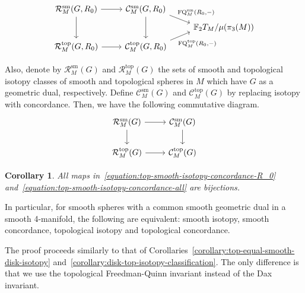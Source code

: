 \documentclass[11pt]{amsart}
\newtheorem{corollary}[theorem]{Corollary}
\theoremstyle{definition}
\theoremstyle{theorem-giventitle}
\theoremstyle{definition-giventitle}
\numberwithin{equation}{section}
\def\cC{\mathcal{C}}
\def\cR{\mathcal{R}}
\def\bF{{\mathbb{F}}}
\def\sm{\mathrm{sm}}
\def\top{\mathrm{top}}
\def\FQ{\operatorname{FQ}}
\begin{document}
\begin{equation}
  \begin{tikzcd}[row sep=tiny]
    \cR^\sm_M(G,R_0) \ar[r] \ar[dd]
    & \cC^\sm_M(G,R_0) \ar[dd]
      \ar[rd,"{\FQ^\sm_M(R_0,-)}",end anchor={[yshift=-.8ex]north west},pos=.3]
    \\
    & & \bF_2 T_M / \mu(\pi_3(M))
    \\
    \cR^\top_M(G,R_0) \ar[r]
    & \cC^\top_M(G,R_0)
      \ar[ru,"{\FQ^\top_M(R_0,-)}"',end anchor={[yshift=.8ex]south west},pos=.3]
    \\
  \end{tikzcd}
  \label{equation:top-smooth-isotopy-concordance-R_0}
\end{equation}
Also, denote by $\cR^\sm_M(G)$ and $\cR^\top_M(G)$ the sets of smooth and topological isotopy classes of smooth and topological spheres in $M$ which have $G$ as a geometric dual, respectively.
Define $\cC^\sm_M(G)$ and $\cC^\top_M(G)$ by replacing isotopy with concordance.
Then, we have the following commutative diagram.
\begin{equation}
  \begin{tikzcd}
    \cR^\sm_M(G) \ar[r] \ar[d] & \cC^\sm_M(G) \ar[d]
    \\
    \cR^\top_M(G) \ar[r] & \cC^\top_M(G)
  \end{tikzcd}
  \label{equation:top-smooth-isotopy-concordance-all}
\end{equation}

\begin{corollary}
  \label{corollary:top-equal-smooth-sphere-isotopy-concordance}
  All maps in~\eqref{equation:top-smooth-isotopy-concordance-R_0} and~\eqref{equation:top-smooth-isotopy-concordance-all} are bijections.
\end{corollary}

In particular, for smooth spheres with a common smooth geometric dual in a smooth 4-manifold, the following are equivalent: smooth isotopy, smooth concordance, topological isotopy and topological concordance.

The proof proceeds similarly to that of Corollaries~\ref{corollary:top-equal-smooth-disk-isotopy} and~\ref{corollary:disk-top-isotopy-classification}\@. The only difference is that we use the topological Freedman-Quinn invariant instead of the Dax invariant.
\end{document}
